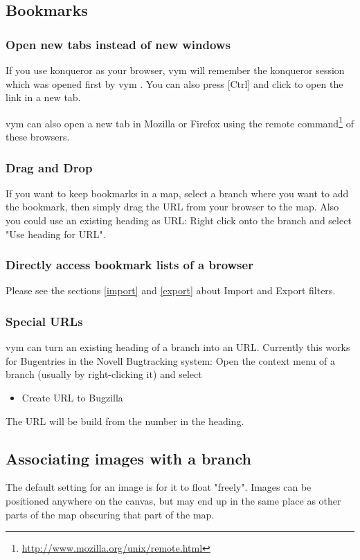 \documentclass[12pt,a4paper]{article}
\newcommand{\vym}{{\sc vym }}
\newcommand{\key}[1]{[#1]}
\begin{document}
\subsection{Bookmarks} \label{bookmarks}
\subsubsection*{Open new tabs instead of new windows}
If you use konqueror as your browser, \vym will remember the konqueror session which
was opened first by \vym. You can also press \key{Ctrl} and click to
open the link in a new tab.

\vym can also open a new tab in Mozilla or Firefox using the remote
command\footnote{\href{http://www.mozilla.org/unix/remote.html}{http://www.mozilla.org/unix/remote.html}}
of these browsers.

\subsubsection*{Drag and Drop}
If you want to keep bookmarks in a map, select a branch where you want
to add the bookmark, then simply drag the URL from your browser to the
map. Also you could use an existing heading as URL: Right click onto the
branch and select "Use heading for URL".


\subsubsection*{Directly access bookmark lists of a browser}
Please see the sections \ref{import} and \ref{export} about
Import and Export filters.

\subsubsection*{Special URLs}
\vym can turn an existing heading of a branch into an URL. Currently
this works for Bugentries in the Novell Bugtracking system: Open the
context menu of a branch (usually by right-clicking it) and select
\begin{itemize}
    \item Create URL to Bugzilla
\end{itemize}
The URL will be build from the number in the heading.

\subsection{Associating images with a branch} \label{incimg}
The default setting for an image is for it to float "freely". Images can be
positioned anywhere on the canvas, but may end up in the same place as other
parts of the map obscuring that part of the map.
\end{document}
